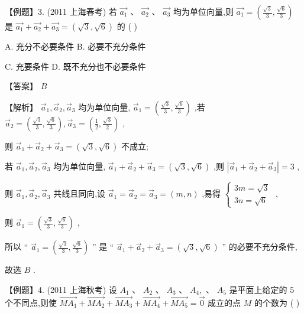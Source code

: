 \documentclass[10pt]{article}
\begin{document}
【例题】3. (2011 上海春考) 若 \(\overrightarrow{{a}_{1}}\text{ 、 }\overrightarrow{{a}_{2}}\text{ 、 }\overrightarrow{{a}_{3}}\) 均为单位向量,则 \(\overrightarrow{{a}_{1}} = \left( {\frac{\sqrt{3}}{3},\frac{\sqrt{6}}{3}}\right)\) 是 \(\overrightarrow{{a}_{1}} + \overrightarrow{{a}_{2}} + \overrightarrow{{a}_{3}} = \left( {\sqrt{3},\sqrt{6}}\right)\) 的 ( )

A. 充分不必要条件 B. 必要不充分条件

C. 充要条件 D. 既不充分也不必要条件

【答案】 \(B\)

【解析】 \({\overrightarrow{a}}_{1},{\overrightarrow{a}}_{2},{\overrightarrow{a}}_{3}\) 均为单位向量, \({\overrightarrow{a}}_{1} = \left( {\frac{\sqrt{3}}{3},\frac{\sqrt{6}}{3}}\right)\) ,若 \({\overrightarrow{a}}_{2} = \left( {\frac{\sqrt{3}}{3},\frac{\sqrt{6}}{3}}\right) ,{\overrightarrow{a}}_{3} = \left( {\frac{1}{2},\frac{\sqrt{3}}{2}}\right)\) ,

则 \({\overrightarrow{a}}_{1} + {\overrightarrow{a}}_{2} + {\overrightarrow{a}}_{3} = \left( {\sqrt{3},\sqrt{6}}\right)\) 不成立;

若 \({\overrightarrow{a}}_{1},{\overrightarrow{a}}_{2},{\overrightarrow{a}}_{3}\) 均为单位向量, \({\overrightarrow{a}}_{1} + {\overrightarrow{a}}_{2} + {\overrightarrow{a}}_{3} = \left( {\sqrt{3},\sqrt{6}}\right)\) ,则 \(\left| {{\overrightarrow{a}}_{1} + {\overrightarrow{a}}_{2} + {\overrightarrow{a}}_{3}}\right|  = 3\) ,

则 \({\overrightarrow{a}}_{1},{\overrightarrow{a}}_{2},{\overrightarrow{a}}_{3}\) 共线且同向,设 \({\overrightarrow{a}}_{1} = {\overrightarrow{a}}_{2} = {\overrightarrow{a}}_{3} = \left( {m,n}\right)\) ,易得 \(\left\{  \begin{array}{l} {3m} = \sqrt{3} \\  {3n} = \sqrt{6} \end{array}\right.\) ,

则 \({\overrightarrow{a}}_{1} = \left( {\frac{\sqrt{3}}{3},\frac{\sqrt{6}}{3}}\right)\) ,

所以 “ \({\overrightarrow{a}}_{1} = \left( {\frac{\sqrt{3}}{3},\frac{\sqrt{6}}{3}}\right)\) ” 是 “ \({\overrightarrow{a}}_{1} + {\overrightarrow{a}}_{2} + {\overrightarrow{a}}_{3} = \left( {\sqrt{3},\sqrt{6}}\right)\) ” 的必要不充分条件,

故选 \(B\) .

【例题】4. (2011 上海秋考) 设 \({A}_{1}\text{ 、 }{A}_{2}\text{ 、 }{A}_{3}\text{ 、 }{A}_{4},\text{ 、 }{A}_{5}\) 是平面上给定的 5 个不同点,则使 \(\overrightarrow{M{A}_{1}} + \overrightarrow{M{A}_{2}} + \overrightarrow{M{A}_{3}} + \overrightarrow{M{A}_{4}} + \overrightarrow{M{A}_{5}} = \overrightarrow{0}\) 成立的点 \(M\) 的个数为 ( )
\end{document}
